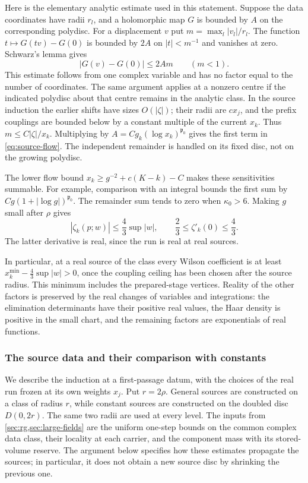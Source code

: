 \documentclass[11pt,letterpaper,reqno]{amsart}
\theoremstyle{definition}
\theoremstyle{remark}
\begin{document}
Here is the elementary analytic estimate used in this statement. Suppose
the data coordinates have radii $r_l$, and a holomorphic map $G$ is
bounded by $A$ on the corresponding polydisc. For a displacement $v$
put $m=\max_l|v_l|/r_l$. The function
$t\mapsto G(tv)-G(0)$ is bounded by $2A$ on $|t|<m^{-1}$ and
vanishes at zero. Schwarz's lemma gives
\[
 |G(v)-G(0)|\le2Am\qquad(m<1).
\]
This estimate follows from one complex variable and has no factor
equal to the number of coordinates. The same argument applies at a
nonzero centre if the indicated polydisc about that centre remains in
the analytic class. In the source induction the earlier shifts have
sizes $O(|\zeta|)$; their radii are $cx_j$, and the prefix couplings
are bounded below by a constant multiple of the current $x_k$.
Thus $m\le C|\zeta|/x_k$. Multiplying by
$A=Cg_k(\log x_k)^{\mathfrak p_0}$ gives the first term in
\eqref{eq:source-flow}. The independent remainder is handled on its
fixed disc, not on the growing polydisc.

The lower flow bound $x_k\ge g^{-2}+c(K-k)-C$ makes these sensitivities
summable. For example, comparison with an integral bounds the first sum
by $Cg(1+|\log g|)^{\mathfrak p_0}$. The remainder sum tends to zero
when $\kappa_0>6$. Making $g$ small after $\rho$ gives
\[
 |\zeta_k(p;w)|\le\frac43\sup|w|,
 \qquad \frac23\le\zeta'_k(0)\le\frac43.
\]
The latter derivative is real, since the run is real at real sources.

In particular, at a real source of the class every Wilson
coefficient is at least
$x_k^{\min}-\frac43\sup|w|>0$, once the coupling ceiling
has been chosen after the source radius. This minimum includes
the prepared-stage vertices. Reality of the other factors is
preserved by the real changes of variables and integrations:
the elimination determinants have their positive real values,
the Haar density is positive in the small chart, and the
remaining factors are exponentials of real functions.

\subsubsection{The source data and their comparison with constants}
\label{sec:source-data-induction}

We describe the induction at a first-passage datum, with the choices
of the real run frozen at its own weights $x_j$. Put $r=2\rho$.
General sources are constructed on a class of radius $r$, while
constant sources are constructed on the doubled disc $D(0,2r)$.
The same two radii are used at every level. The inputs from
\cref{sec:rg,sec:large-fields} are the uniform one-step bounds on the
common complex data class, their locality at each carrier, and the
component mass with its stored-volume reserve. The argument below
specifies how these estimates propagate the sources; in particular,
it does not obtain a new source disc by shrinking the previous one.
\end{document}
